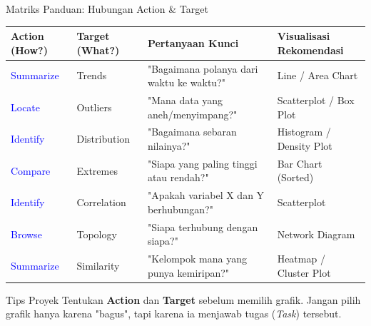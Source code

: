 \documentclass[t]{beamer}
\begin{document}
\begin{frame}{Matriks Panduan: Hubungan Action \& Target}
    \centering
    \tiny
    \begin{tabular}{@{} llll @{}}
        \toprule
        \textbf{Action (How?)} & \textbf{Target (What?)} & \textbf{Pertanyaan Kunci} & \textbf{Visualisasi Rekomendasi} \\ 
        \midrule
        \textcolor{blue}{Summarize} & Trends & "Bagaimana polanya dari waktu ke waktu?" & Line / Area Chart \\ \addlinespace
        \textcolor{blue}{Locate} & Outliers & "Mana data yang aneh/menyimpang?" & Scatterplot / Box Plot \\ \addlinespace
        \textcolor{blue}{Identify} & Distribution & "Bagaimana sebaran nilainya?" & Histogram / Density Plot \\ \addlinespace
        \textcolor{blue}{Compare} & Extremes & "Siapa yang paling tinggi atau rendah?" & Bar Chart (Sorted) \\ \addlinespace
        \textcolor{blue}{Identify} & Correlation & "Apakah variabel X dan Y berhubungan?" & Scatterplot \\ \addlinespace
        \textcolor{blue}{Browse} & Topology & "Siapa terhubung dengan siapa?" & Network Diagram \\ \addlinespace
        \textcolor{blue}{Summarize} & Similarity & "Kelompok mana yang punya kemiripan?" & Heatmap / Cluster Plot \\ 
        \bottomrule
    \end{tabular}
    
    \vspace{0.4cm}
    \normalsize
    \begin{alertblock}{Tips Proyek}
        Tentukan \textbf{Action} dan \textbf{Target} sebelum memilih grafik. Jangan pilih grafik hanya karena "bagus", tapi karena ia menjawab tugas (\textit{Task}) tersebut.
    \end{alertblock}
\end{frame}
\end{document}
